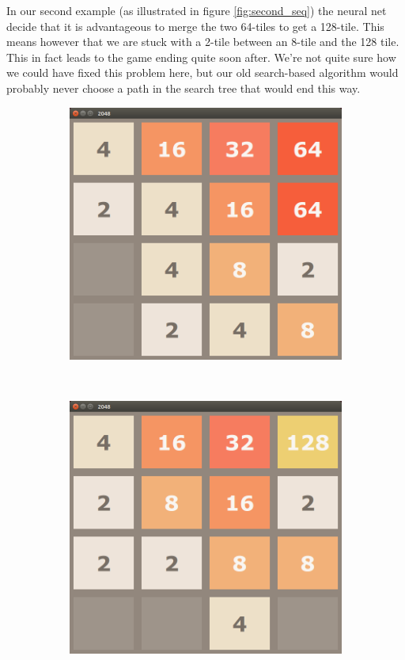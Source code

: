 \documentclass[11pt,a4paper]{article}
\begin{document}
In our second example (as illustrated in figure \ref{fig:second_seq}) the neural net decide that it is advantageous to merge the two 64-tiles to get a 128-tile. This means however that we are stuck with a 2-tile between an 8-tile and the 128 tile. This in fact leads to the game ending quite soon after. We're not quite sure how we could have fixed this problem here, but our old search-based algorithm would probably never choose a path in the search tree that would end this way.

\begin{figure}[h!]
    \centering
    \begin{subfigure}[b]{0.45\textwidth}
        \includegraphics[width=\textwidth]{figures/64}
    \end{subfigure}
    ~
    \begin{subfigure}[b]{0.45\textwidth}
        \includegraphics[width=\textwidth]{figures/128}

\end{subfigure}
\end{figure}
\end{document}
